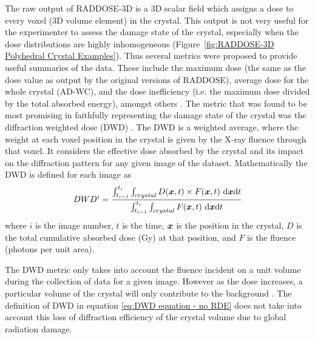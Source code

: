         The raw output of RADDOSE-3D is a 3D scalar field which assigns a dose to every voxel (3D volume element) in the crystal.
        This output is not very useful for the experimenter to assess the damage state of the crystal, especially when the dose distributions are highly inhomogeneous (Figure~\ref{fig:RADDOSE-3D Polyhedral Crystal Examples}).
        Thus several metrics were proposed to provide useful summaries of the data.
        These include the maximum dose (the same as the dose value as output by the original versions of RADDOSE), average dose for the whole crystal (AD-WC), and the dose inefficiency (i.e. the maximum dose divided by the total absorbed energy), amongst others \cite{zeldin2012}.
        The metric that was found to be most promising in faithfully representing the damage state of the crystal was the diffraction weighted dose (DWD) \cite{zeldin2013dwd}.
        The DWD is a weighted average, where the weight at each voxel position in the crystal is given by the X-ray fluence through that voxel.
        It considers the effective dose absorbed by the crystal and its impact on the diffraction pattern for any given image of the dataset.
        Mathematically the DWD is defined for each image as
        \begin{equation}
            DWD^i = \f{\int_{t_{i-1}}^{t_i} \int_{crystal} D(\bs{x},t) \times F(\bs{x},t)\ \mathrm{d}\bs{x}\mathrm{d}t}{\int_{t_{i-1}}^{t_i} \int_{crystal} F(\bs{x},t)\ \mathrm{d}\bs{x}\mathrm{d}t}
            \label{eq:DWD equation - no RDE}
        \end{equation}
        where $i$ is the image number, $t$ is the time, $\boldsymbol{x}$ is the position in the crystal, $D$ is the total cumulative absorbed dose (Gy) at that position, and $F$ is the fluence (photons per unit area).

        The DWD metric only takes into account the fluence incident on a unit volume during the collection of data for a given image.
        However as the dose increases, a particular volume of the crystal will only contribute to the background \cite{blake1962}.
        The definition of DWD in equation \ref{eq:DWD equation - no RDE} does not take into account this loss of diffraction efficiency of the crystal volume due to global radiation damage.

